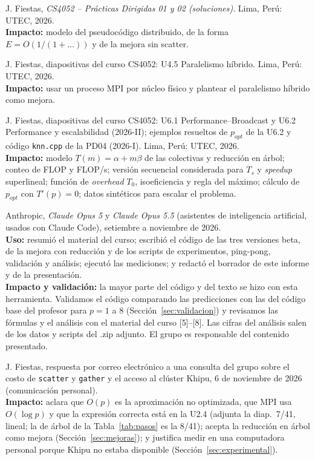 \documentclass[11pt,a4paper]{article}
\begin{document}
\begin{enumerate}[label={[\arabic*]}, leftmargin=*, itemsep=2pt, parsep=0pt, topsep=2pt]
  \item J. Fiestas, \textit{CS4052 -- Prácticas Dirigidas 01 y 02 (soluciones)}. Lima, Perú: UTEC, 2026.\\
  \textbf{Impacto:} modelo del pseudocódigo distribuido, de la forma $E = O(1/(1 + \dots))$ y de la mejora sin scatter.

  \item J. Fiestas, diapositivas del curso CS4052: U4.5 Paralelismo híbrido. Lima, Perú: UTEC, 2026.\\
  \textbf{Impacto:} usar un proceso MPI por núcleo físico y plantear el paralelismo híbrido como mejora.

  \item J. Fiestas, diapositivas del curso CS4052: U6.1 Performance--Broadcast y U6.2 Performance y escalabilidad (2026-II); ejemplos resueltos de $p_{opt}$ de la U6.2 y código \texttt{knn.cpp} de la PD04 (\mbox{2026-I}). Lima, Perú: UTEC, 2026.\\
  \textbf{Impacto:} modelo $T(m) = \alpha + m\beta$ de las colectivas y reducción en árbol; conteo de FLOP y FLOP/s; versión secuencial considerada para $T_s$ y \textit{speedup} superlineal; función de \textit{overhead} $T_0$, isoeficiencia y regla del máximo; cálculo de $p_{opt}$ con $T'(p) = 0$; datos sintéticos para escalar el problema.

  \item Anthropic, \textit{Claude Opus 5} y \textit{Claude Opus 5.5} (asistentes de inteligencia artificial, usados con Claude Code), setiembre a noviembre de 2026.\\
  \textbf{Uso:} resumió el material del curso; escribió el código de las tres versiones beta, de la mejora con reducción y de los scripts de experimentos, ping-pong, validación y análisis; ejecutó las mediciones; y redactó el borrador de este informe y de la presentación.\\
  \textbf{Impacto y validación:} la mayor parte del código y del texto se hizo con esta herramienta. Validamos el código comparando las predicciones con las del código base del profesor para $p = 1$ a $8$ (Sección~\ref{sec:validacion}) y revisamos las fórmulas y el análisis con el material del curso [5]--[8]. Las cifras del análisis salen de los datos y scripts del .zip adjunto. El grupo es responsable del contenido presentado.

  \item J. Fiestas, respuesta por correo electrónico a una consulta del grupo sobre el costo de \texttt{scatter} y \texttt{gather} y el acceso al clúster Khipu, 6 de noviembre de 2026 (comunicación personal).\\
  \textbf{Impacto:} aclara que $O(p)$ es la aproximación no optimizada, que MPI usa $O(\log p)$ y que la expresión correcta está en la U2.4 (adjunta la diap.~7/41, lineal; la de árbol de la Tabla~\ref{tab:pasos} es la 8/41); acepta la reducción en árbol como mejora (Sección~\ref{sec:mejoras}); y justifica medir en una computadora personal porque Khipu no estaba disponible (Sección~\ref{sec:experimental}).
\end{enumerate}
\end{document}
